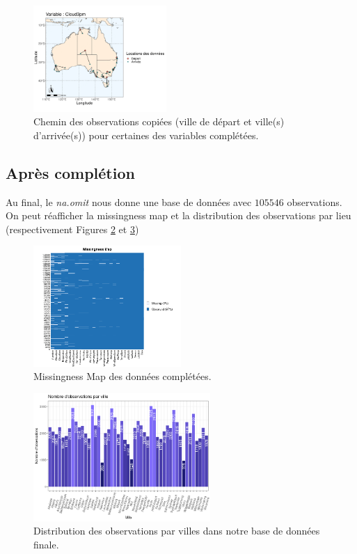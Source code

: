 \documentclass{article}
\begin{document}
\begin{figure}[ht]
    \includegraphics[width=0.45\textwidth]{Images/Australia_map_segments_complete/Australia_map_segments_complete-13.png}
    \caption{Chemin des observations copiées (ville de départ et ville(s) d'arrivée(s)) pour certaines des variables complétées.}
    \label{fig:path_data}
\end{figure}

\subsection{Après complétion}

Au final, le \emph{na.omit} nous donne une base de données avec $105546$ observations. On peut réafficher la missingness map et la distribution des observations par lieu (respectivement Figures \ref{fig:missingness_completed} et \ref{fig:distrib_completed})

\begin{figure}[ht]
    \centering
    \includegraphics[width=0.5\textwidth]{Images/missmap_completed.png}
    \caption{Missingness Map des données complétées.}
    \label{fig:missingness_completed}
\end{figure}

\begin{figure}[ht]
    \centering
    \includegraphics[width=0.6\textwidth]{Images/distribution_lieux_completed.png}
    \caption{Distribution des observations par villes dans notre base de données finale.}
    \label{fig:distrib_completed}
\end{figure}
\end{document}

